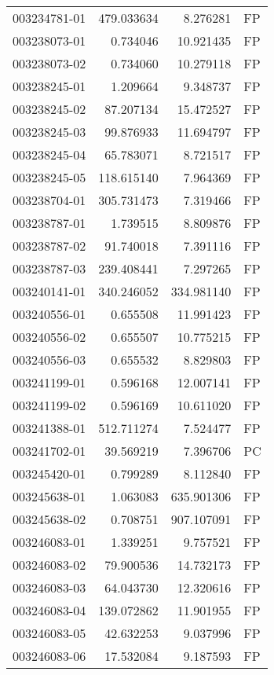 \begin{tabular}{lrrl}
003234781-01 &  479.033634 &     8.276281 &   FP \\
003238073-01 &    0.734046 &    10.921435 &   FP \\
003238073-02 &    0.734060 &    10.279118 &   FP \\
003238245-01 &    1.209664 &     9.348737 &   FP \\
003238245-02 &   87.207134 &    15.472527 &   FP \\
003238245-03 &   99.876933 &    11.694797 &   FP \\
003238245-04 &   65.783071 &     8.721517 &   FP \\
003238245-05 &  118.615140 &     7.964369 &   FP \\
003238704-01 &  305.731473 &     7.319466 &   FP \\
003238787-01 &    1.739515 &     8.809876 &   FP \\
003238787-02 &   91.740018 &     7.391116 &   FP \\
003238787-03 &  239.408441 &     7.297265 &   FP \\
003240141-01 &  340.246052 &   334.981140 &   FP \\
003240556-01 &    0.655508 &    11.991423 &   FP \\
003240556-02 &    0.655507 &    10.775215 &   FP \\
003240556-03 &    0.655532 &     8.829803 &   FP \\
003241199-01 &    0.596168 &    12.007141 &   FP \\
003241199-02 &    0.596169 &    10.611020 &   FP \\
003241388-01 &  512.711274 &     7.524477 &   FP \\
003241702-01 &   39.569219 &     7.396706 &   PC \\
003245420-01 &    0.799289 &     8.112840 &   FP \\
003245638-01 &    1.063083 &   635.901306 &   FP \\
003245638-02 &    0.708751 &   907.107091 &   FP \\
003246083-01 &    1.339251 &     9.757521 &   FP \\
003246083-02 &   79.900536 &    14.732173 &   FP \\
003246083-03 &   64.043730 &    12.320616 &   FP \\
003246083-04 &  139.072862 &    11.901955 &   FP \\
003246083-05 &   42.632253 &     9.037996 &   FP \\
003246083-06 &   17.532084 &     9.187593 &   FP \\

\end{tabular}
